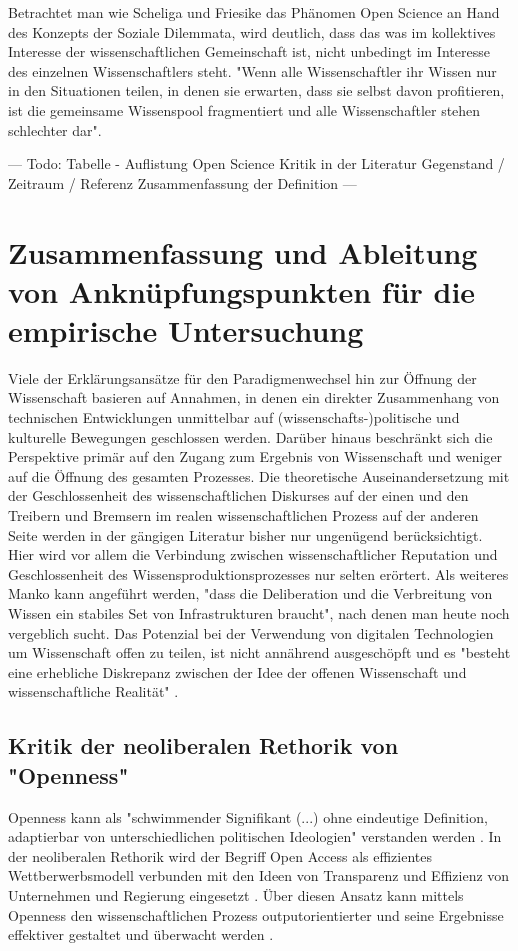 Betrachtet man wie Scheliga und Friesike das Phänomen Open Science an Hand des Konzepts der Soziale Dilemmata, wird deutlich, dass das was im kollektives Interesse der wissenschaftlichen Gemeinschaft ist, nicht unbedingt im Interesse des einzelnen Wissenschaftlers steht. "Wenn alle Wissenschaftler ihr Wissen nur in den Situationen teilen, in denen sie erwarten, dass sie selbst davon profitieren, ist die gemeinsame Wissenspool fragmentiert und alle Wissenschaftler stehen schlechter dar"\cite{Scheliga_2014}.

--- Todo: Tabelle - Auflistung Open Science Kritik in der Literatur
Gegenstand / Zeitraum / Referenz
Zusammenfassung der Definition ---


\section{Zusammenfassung und Ableitung von Anknüpfungspunkten für die empirische Untersuchung}
Viele der Erklärungsansätze für den Paradigmenwechsel hin zur Öffnung der Wissenschaft basieren auf Annahmen, in denen ein direkter Zusammenhang von technischen Entwicklungen unmittelbar auf (wissenschafts-)politische und kulturelle Bewegungen geschlossen werden. Darüber hinaus beschränkt sich die Perspektive primär auf den Zugang zum Ergebnis von Wissenschaft und weniger auf die Öffnung des gesamten Prozesses. Die theoretische Auseinandersetzung mit der Geschlossenheit des wissenschaftlichen Diskurses auf der einen und den Treibern und Bremsern im realen wissenschaftlichen Prozess auf der anderen Seite werden in der gängigen Literatur bisher nur ungenügend berücksichtigt. Hier wird vor allem die Verbindung zwischen wissenschaftlicher Reputation und Geschlossenheit des Wissensproduktionsprozesses nur selten erörtert. Als weiteres Manko kann angeführt werden, "dass die Deliberation und die Verbreitung von Wissen ein stabiles Set von Infrastrukturen braucht"\cite{kelty_2004}, nach denen man heute noch vergeblich sucht. Das Potenzial bei der Verwendung von digitalen Technologien um Wissenschaft offen zu teilen, ist nicht annährend ausgeschöpft und es "besteht eine erhebliche Diskrepanz zwischen der Idee der offenen Wissenschaft und wissenschaftliche Realität" \cite{Scheliga_2014}.


\subsection{Kritik der neoliberalen Rethorik von "Openness"}

Openness kann als "schwimmender Signifikant (...) ohne eindeutige Definition, adaptierbar von unterschiedlichen politischen Ideologien" verstanden werden \cite{Adema_2014_open_access}. In der neoliberalen Rethorik wird der Begriff Open Access als effizientes Wettberwerbsmodell verbunden mit den Ideen von Transparenz und Effizienz von Unternehmen und Regierung eingesetzt \cite{tkacz_2012_open}. Über diesen Ansatz kann mittels Openness den wissenschaftlichen Prozess outputorientierter und seine Ergebnisse effektiver gestaltet und überwacht werden \cite{adema_2010_oaoverview} .


